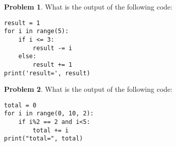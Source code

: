\documentclass[10pt]{article}
\theoremstyle{definition}
\newtheorem{problem}{Problem}
\begin{document}
\begin{problem}
    What is the output of the following code:
\end{problem}
\begin{lstlisting}
result = 1
for i in range(5):
    if i <= 3:
        result -= i
    else:
        result += 1
print('result=', result)
\end{lstlisting}
\vspace{2in}


\begin{problem}
    What is the output of the following code:
\end{problem}
\begin{lstlisting}
total = 0
for i in range(0, 10, 2):
    if i%2 == 2 and i<5:
        total += i
print("total=", total)
\end{lstlisting}
\vspace{2in}
\end{document}
